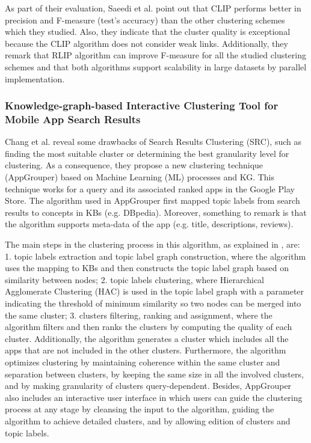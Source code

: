 \documentclass[runningheads]{llncs}
\begin{document}
As part of their evaluation, Saeedi et al. \cite{Saeedi} point out that CLIP performs better in precision and F-measure (test's accuracy) than the other clustering schemes which they studied. Also, they indicate that the cluster quality is exceptional because the CLIP algorithm does not  consider weak links. Additionally, they remark that RLIP algorithm can improve F-measure for all the studied clustering schemes and that both algorithms support scalability in large datasets by parallel implementation.

\subsubsection{Knowledge-graph-based Interactive Clustering Tool for Mobile App Search Results}

Chang et al. \cite{Chang} reveal some drawbacks of Search Results Clustering (SRC), such as finding the most suitable cluster or determining the best granularity level for clustering. As a consequence, they propose a new clustering technique (AppGrouper) based on Machine Learning (ML) processes and KG. This technique works for a query and its associated ranked apps in the Google Play Store. The algorithm used in AppGrouper first mapped topic labels from search results to concepts in KBs (e.g. DBpedia). Moreover, something to remark is that the algorithm supports meta-data of the app (e.g. title, descriptions, reviews).

The main steps in the clustering process in this algorithm, as explained in \cite{Chang}, are: 1. topic labels extraction and topic label graph construction, where the algorithm uses the mapping to KBs and then constructs the topic label graph based on similarity between nodes; 2. topic labels clustering, where Hierarchical Agglomerate Clustering (HAC) is used in the topic label graph with a parameter indicating the threshold of minimum similarity so two nodes can be merged into the same cluster; 3. clusters filtering, ranking and assignment, where the algorithm filters and then ranks the clusters by computing the quality of each cluster. Additionally, the algorithm generates a cluster which includes all the apps that are not included in the other clusters. Furthermore, the algorithm optimizes clustering by maintaining coherence within the same cluster and separation between clusters, by keeping the same size in all the involved clusters, and by making granularity of clusters query-dependent. Besides, AppGrouper also includes an interactive user interface in which users can guide the clustering process at any stage by cleansing the input to the algorithm, guiding the algorithm to achieve detailed clusters, and by allowing edition of clusters and topic labels. 
\end{document}
